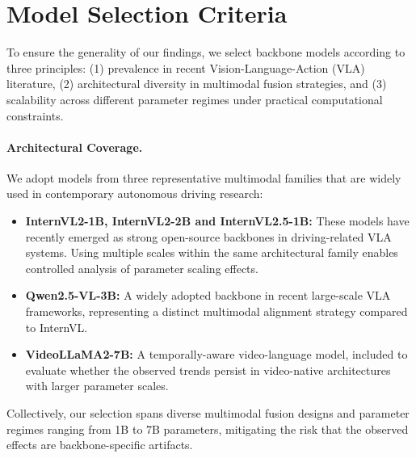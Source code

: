 \documentclass{article}
\begin{document}
\clearpage 
\section{Model Selection Criteria}
\label{appendix:model_selection_criteria}


To ensure the generality of our findings, we select backbone models according to three principles:
(1) prevalence in recent Vision-Language-Action (VLA) literature,
(2) architectural diversity in multimodal fusion strategies, and
(3) scalability across different parameter regimes under practical computational constraints.

\paragraph{Architectural Coverage.}
We adopt models from three representative multimodal families that are widely used in contemporary autonomous driving research:

\begin{itemize}
    \item \textbf{InternVL2-1B, InternVL2-2B and InternVL2.5-1B:}
    These models have recently emerged as strong open-source backbones in driving-related VLA systems. 
    Using multiple scales within the same architectural family enables controlled analysis of parameter scaling effects.
    
    \item \textbf{Qwen2.5-VL-3B:}
    A widely adopted backbone in recent large-scale VLA frameworks, representing a distinct multimodal alignment strategy compared to InternVL.
    
    \item \textbf{VideoLLaMA2-7B:}
    A temporally-aware video-language model, included to evaluate whether the observed trends persist in video-native architectures with larger parameter scales.
\end{itemize}

Collectively, our selection spans diverse multimodal fusion designs and parameter regimes ranging from 1B to 7B parameters, mitigating the risk that the observed effects are backbone-specific artifacts.
\end{document}
